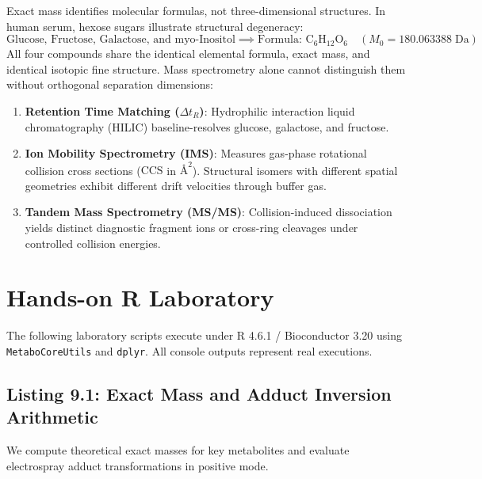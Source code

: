 \documentclass[11pt,twoside,openright]{book}
\begin{document}
Exact mass identifies molecular formulas, not three-dimensional structures. In human serum, hexose sugars illustrate structural degeneracy:
\begin{equation}
\text{Glucose, Fructose, Galactose, and myo-Inositol} \implies \text{Formula: } \text{C}_6\text{H}_{12}\text{O}_6 \quad (M_0 = 180.063388\;\text{Da})
\end{equation}
All four compounds share the identical elemental formula, exact mass, and identical isotopic fine structure. Mass spectrometry alone cannot distinguish them without orthogonal separation dimensions:
\begin{enumerate}
    \item \textbf{Retention Time Matching ($\Delta t_R$)}: Hydrophilic interaction liquid chromatography (HILIC) baseline-resolves glucose, galactose, and fructose.
    \item \textbf{Ion Mobility Spectrometry (IMS)}: Measures gas-phase rotational collision cross sections ($\text{CCS}$ in $\text{\AA}^2$). Structural isomers with different spatial geometries exhibit different drift velocities through buffer gas.
    \item \textbf{Tandem Mass Spectrometry (MS/MS)}: Collision-induced dissociation yields distinct diagnostic fragment ions or cross-ring cleavages under controlled collision energies.
\end{enumerate}

\section{Hands-on R Laboratory}

The following laboratory scripts execute under R 4.6.1 / Bioconductor 3.20 using \texttt{MetaboCoreUtils} and \texttt{dplyr}. All console outputs represent real executions.

\subsection{Listing 9.1: Exact Mass and Adduct Inversion Arithmetic}

We compute theoretical exact masses for key metabolites and evaluate electrospray adduct transformations in positive mode.
\end{document}
